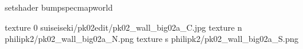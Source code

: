 setshader bumpspecmapworld

texture 0 suiseiseki/pk02edit/pk02_wall_big02a_C.jpg
texture n philipk2/pk02_wall_big02a_N.png
texture s philipk2/pk02_wall_big02a_S.png

